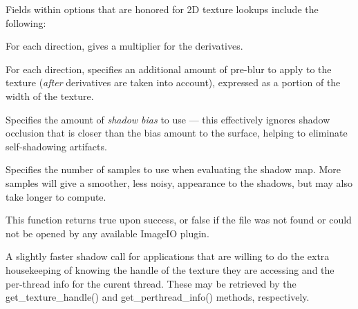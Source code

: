 Fields within {\cf options} that are honored for 2D texture lookups
include the following:

\vspace{-12pt}
\vspace{10pt}
For each direction, gives a multiplier for the derivatives.
\apiend

\vspace{-24pt}
\vspace{10pt}
For each direction, specifies an additional amount of pre-blur to apply
to the texture (\emph{after} derivatives are taken into account),
expressed as a portion of the width of the texture.
\apiend

\vspace{-24pt}
\vspace{10pt}
Specifies the amount of \emph{shadow bias} to use --- this effectively
ignores shadow occlusion that is closer than the bias amount to the
surface, helping to eliminate self-shadowing artifacts.
\apiend

\vspace{-24pt}
\vspace{10pt}
Specifies the number of samples to use when evaluating the shadow map.
More samples will give a smoother, less noisy, appearance to the
shadows, but may also take longer to compute.
\apiend

This function returns {\cf true} upon success, or {\cf false} if the
file was not found or could not be opened by any available ImageIO
plugin.
\apiend

A slightly faster {\cf shadow} call for applications that are willing
to do the extra housekeeping of knowing the handle of the texture they
are accessing and the per-thread info for the curent thread.  These
may be retrieved by the {\cf get_texture_handle()} and 
{\cf get_perthread_info()} methods, respectively.
\apiend


